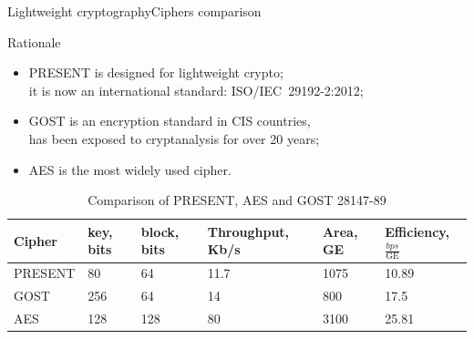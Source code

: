 \documentclass[10pt, ucs]{beamer}
\begin{document}
\begin{frame}{Lightweight cryptography}{Ciphers comparison}
    \begin{block}{Rationale}
        \begin{itemize}
            \item PRESENT is designed for lightweight crypto; \\
                it is now an international standard: ISO/IEC~29192-2:2012;
            \item GOST is an encryption standard in CIS countries, \\
                has been exposed to cryptanalysis for over 20 years;
            \item AES is the most widely used cipher.
        \end{itemize}
    \end{block}
    \begin{table}[htbp]
        \centering
        \caption{Comparison of PRESENT, AES and GOST 28147-89}
        \label{tbl:comparison}
        \begin{tabular}{|l|p{1cm}|p{1cm}|p{2cm}|p{1.2cm}|p{1.5cm}|}
            \hline
            Cipher  & key, bits & block, bits & Throughput, Kb/s & Area, GE & Efficiency, $\frac{bps}{\text{GE}}$ \\
            \hline
            PRESENT & 80  & 64  & 11.7 & 1075 & 10.89 \\
            \hline
            GOST    & 256 & 64  & 14   & 800  & 17.5  \\
            \hline
            AES     & 128 & 128 & 80   & 3100 & 25.81 \\
            \hline
        \end{tabular}
    \end{table}
\end{frame}
\end{document}
